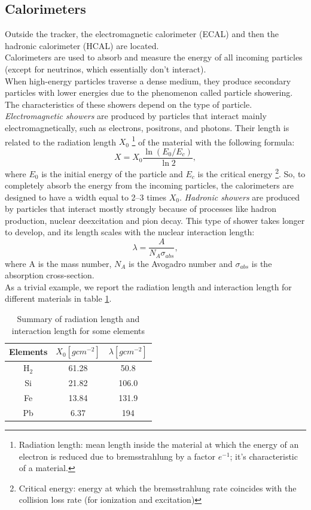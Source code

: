 \subsection{Calorimeters}
Outside the tracker, the electromagnetic calorimeter (ECAL) and then the hadronic calorimeter (HCAL) are located.\\
Calorimeters are used to absorb and measure the energy of all incoming particles (except for neutrinos, which essentially don't interact). \\
When high-energy particles traverse a dense medium, they produce secondary particles with lower energies due to the phenomenon called particle showering. The characteristics of these showers depend on the type of particle.\\
\textit{Electromagnetic showers} are produced by particles that interact mainly electromagnetically, such as electrons, positrons, and photons. Their length is related to the radiation length $X_0$ \footnote{Radiation length: mean length inside the material at which the energy of an electron is reduced due to bremsstrahlung by a factor $e^{-1}$; it's characteristic of a material.} of the material with the following formula:
\begin{equation}
    X = X_0 \frac{\ln(E_0/E_c)}{\ln 2},    
\end{equation}
where $E_0$ is the initial energy of the particle and $E_c$ is the critical energy \footnote{Critical energy: energy at which the bremsstrahlung rate coincides with the collision loss rate (for ionization and excitation)}.
So, to completely absorb the energy from the incoming particles, the calorimeters are designed to have a width equal to 2–3 times $X_0$. %
\textit{Hadronic showers} are produced by particles that interact mostly strongly because of processes like hadron production, nuclear deexcitation and pion decay. This type of shower takes longer to develop, and its length scales with the nuclear interaction length:
\begin{equation}
    \lambda = \frac{A}{N_A \sigma_{abs}},
\end{equation}
where A is the mass number, $N_A$ is the Avogadro number and $\sigma_{abs}$ is the absorption cross-section.
\\
As a trivial example, we report the radiation length and interaction length for different materials in table \ref{x_0}.
\begin{table}[h]
\centering
    \begin{tabular}{c|c|c}
 Elements &$X_0 [g cm^{-2}]$ & $\lambda [g cm^{-2}]$ \\\hline
     H$_2$ &  61.28 & 50.8 \\\hline
     Si & 21.82 & 106.0\\\hline
     Fe & 13.84 & 131.9\\\hline
     Pb & 6.37 & 194 \\
    \end{tabular}
    \caption{Summary of radiation length and interaction length for some elements}
    \label{x_0}
\end{table}

